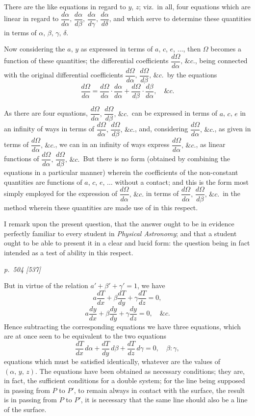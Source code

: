 \documentclass[11pt,a4paper]{book}
\begin{document}
There are the like equations in regard to $y$, $z$; viz.\ in all, four equations which are
linear in regard to $\dfrac{d\alpha}{d\alpha},\, \dfrac{d\alpha}{d\beta},\, \dfrac{d\alpha}{d\gamma},\, \dfrac{d\alpha}{d\delta}$, and which serve to determine these quantities in
terms of $\alpha,\, \beta,\, \gamma,\, \delta$.

Now considering the $a$, $y$ as expressed in terms of $a$, $c$, $e$, $\ldots$, then $\Omega$ becomes
a function of these quantities; the differential coefficients $\dfrac{d\Omega}{d\alpha},\, \&c.$, being connected
with the original differential coefficients $\dfrac{d\Omega}{d\alpha},\, \dfrac{d\Omega}{d\beta},\, \&c.$\, by the equations
\[
\frac{d\Omega}{d\alpha} = \frac{d\Omega}{d\alpha} \cdot \frac{d\alpha}{d\alpha} + \frac{d\Omega}{d\beta} \cdot \frac{d\beta}{d\alpha}, \quad \&c.
\]

As there are four equations, $\dfrac{d\Omega}{d\alpha},\, \dfrac{d\Omega}{d\beta},\, \&c.$\, can be expressed in terms of $a$, $c$, $e$ in an infinity of ways in
terms of $\dfrac{d\Omega}{d\alpha},\, \dfrac{d\Omega}{d\beta},\, \&c.$, and, considering $\dfrac{d\Omega}{d\alpha},\, \&c.$, as given in terms of $\dfrac{d\Omega}{d\alpha},\, \&c.$, we can in an infinity of ways express $\dfrac{d\Omega}{d\alpha},\, \&c.$, as linear functions of $\dfrac{d\Omega}{d\alpha},\, \dfrac{d\Omega}{d\beta},\, \&c.$\,
But there is no form (obtained by combining the equations in a particular manner)
wherein the coefficients of the non-constant quantities are functions of $a$, $c$, $e$, $\ldots$ without
a contact; and this is the form most simply employed for the expression of $\dfrac{d\Omega}{d\alpha},\, \&c.$
in terms of $\dfrac{d\Omega}{d\alpha},\, \dfrac{d\Omega}{d\beta},\, \&c.$\, in the method wherein these quantities are made use of in this respect.

I remark upon the present question, that the answer ought to be in evidence
perfectly familiar to every student in \textit{Physical Astronomy}; and that a student ought
to be able to present it in a clear and lucid form: the question being in fact
intended as a test of ability in this respect.

\clearpage

\bigskip
\textit{p.~504 [537]}
\smallskip

\noindent
But in virtue of the relation $a' + \beta' + \gamma' = 1$, we have
\[
a\frac{dT}{dx} + \beta\frac{dT}{dy} + \gamma\frac{dT}{dz} = 0,
\]
\[
a\frac{dy}{dx} + \beta\frac{dy}{dy} + \gamma\frac{dy}{dz} = 0, \quad \&c.
\]
Hence subtracting the corresponding equations we have three equations, which are at
once seen to be equivalent to the two equations
\[
\frac{dT}{dx}\,d\alpha + \frac{dT}{dy}\,d\beta + \frac{dT}{dz}\,d\gamma = 0, \quad \beta : \gamma,
\]
equations which must be satisfied identically, whatever are the values of $(\alpha,\, y,\, z)$. The
equations have been obtained as necessary conditions; they are, in fact, the sufficient
conditions for a double system; for the line being supposed in passing from $P$ to $P'$,
to remain always in contact with the surface, the result is in passing from $P$ to $P'$,
it is necessary that the same line should also be a line of the surface.
\end{document}
